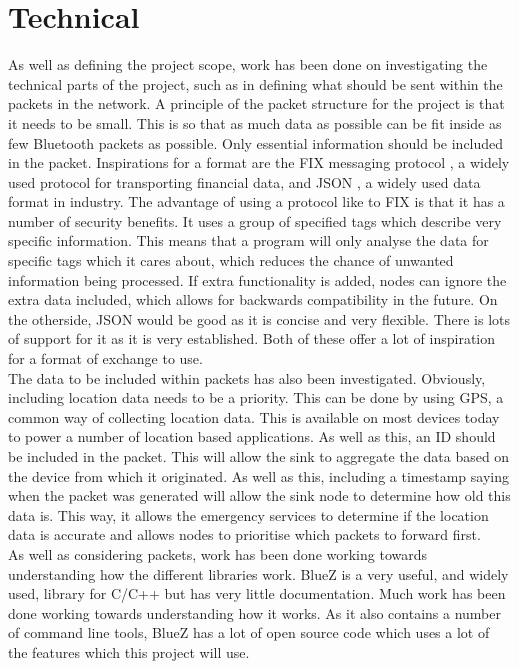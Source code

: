 \documentclass{report}
\begin{document}
\section{Technical}
As well as defining the project scope, work has been done on investigating the technical parts of the project, such as in defining what should be sent within the packets in the network. A principle of the packet structure for the project is that it needs to be small. This is so that as much data as possible can be fit inside as few Bluetooth packets \cite{blepacket} as possible. Only essential information should be included in the packet. Inspirations for a format are the FIX messaging protocol \cite{FIXSPEC}, a widely used protocol for transporting financial data, and JSON \cite{json}, a widely used data format in industry. The advantage of using a protocol like to FIX is that it has a number of security benefits. It uses a group of specified tags which describe very specific information. This means that a program will only analyse the data for specific tags which it cares about, which reduces the chance of unwanted information being processed. If extra functionality is added, nodes can ignore the extra data included, which allows for backwards compatibility in the future. On the otherside, JSON would be good as it is concise and very flexible. There is lots of support for it as it is very established. Both of these offer a lot of inspiration for a format of exchange to use.
\bigskip\\
The data to be included within packets has also been investigated. Obviously, including location data needs to be a priority. This can be done by using GPS, a common way of collecting location data. This is available on most devices today to power a number of location based applications. As well as this, an ID should be included in the packet. This will allow the sink to aggregate the data based on the device from which it originated. As well as this, including a timestamp saying when the packet was generated will allow the sink node to determine how old this data is. This way, it allows the emergency services to determine if the location data is accurate and allows nodes to prioritise which packets to forward first. 
\bigskip\\
As well as considering packets, work has been done working towards understanding how the different libraries work. BlueZ \cite{bluez} is a very useful, and widely used, library for C/C++ but has very little documentation. Much work has been done working towards understanding how it works. As it also contains a number of command line tools, BlueZ has a lot of open source code which uses a lot of the features which this project will use. 
\end{document}
